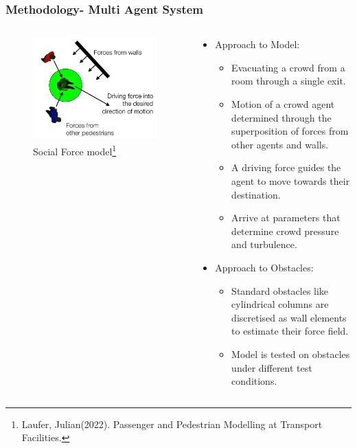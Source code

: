 \documentclass{beamer}
\begin{document}
\begin{frame}    \frametitle{Methodology- Multi Agent System}
\begin{columns}
\begin{column}{0.4\textwidth}
    \begin{figure}
    \centering
        \includegraphics[width=1\textwidth]{social_force.png}
        \caption{Social Force model\footnote[frame]{\tiny Laufer, Julian(2022). Passenger and Pedestrian Modelling at Transport Facilities. }}
    \end{figure}
\end{column}
\begin{column}{0.6\textwidth}
	\begin{itemize}
	\item Approach to Model:
	\begin{itemize}\scriptsize
		\item Evacuating a crowd from a room through a single exit.
		\item Motion of a crowd agent determined through the superposition of forces from other agents and walls.
		\item A driving force guides the agent to move towards their destination. 
		\item Arrive at parameters that determine crowd pressure and turbulence.
	\end{itemize}
	\item Approach to Obstacles:
	\begin{itemize}\scriptsize
		\item Standard obstacles like cylindrical columns are discretised as wall elements to estimate their force field.
		\item Model is tested on obstacles under different test conditions.
	\end{itemize}
	\end{itemize}
\end{column}
\end{columns}

\end{frame}
\end{document}
